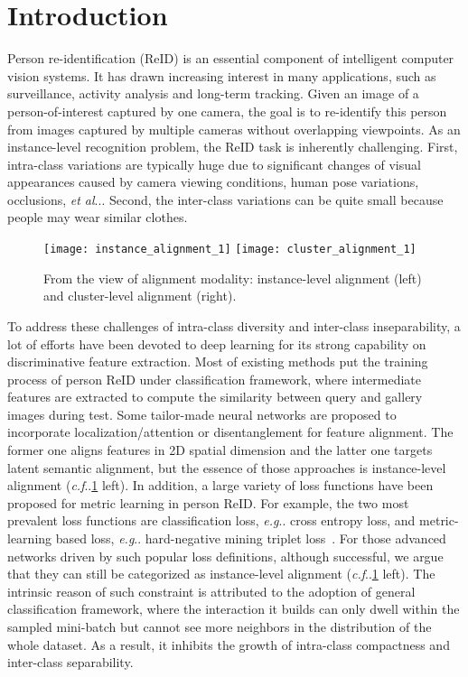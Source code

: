 \documentclass[runningheads]{llncs}
\makeatletter
\DeclareRobustCommand\onedot{\futurelet\@let@token\@onedot}
\def\@onedot{\ifx\@let@token.\else.\null\fi\xspace}
\def\eg{\emph{e.g}\onedot} \def\Eg{\emph{E.g}\onedot}
\def\cf{\emph{c.f}\onedot} \def\Cf{\emph{C.f}\onedot}
\def\etal{\emph{et al}\onedot}
\makeatother
\begin{document}
\section{Introduction}
Person re-identification (ReID) is an essential component of intelligent computer vision systems. It has drawn increasing interest in many applications, such as surveillance, activity analysis and long-term tracking.  Given an image of a person-of-interest captured by one  camera, the goal is to re-identify this person from images captured by multiple cameras without overlapping viewpoints. As an instance-level recognition problem, the ReID task is inherently challenging. First, intra-class variations are typically huge due to significant changes of visual appearances caused by camera viewing conditions, human pose variations, occlusions, \etal. Second, the inter-class variations can be quite small because people may wear similar clothes.

\begin{figure}
    \centering
    \texttt{[image: instance\_alignment\_1]}
    \texttt{[image: cluster\_alignment\_1]}
    \vspace*{-0.38cm}
    \caption{From the view of alignment modality: instance-level alignment (left) and cluster-level alignment (right).}
    \label{fig:comp-alignment}
    \vspace*{-0.68cm}
\end{figure}
To address these challenges of  intra-class diversity and inter-class inseparability, a lot of efforts have been devoted to deep learning for its strong capability on discriminative feature extraction. Most of existing methods put the training process of person ReID under classification framework, where intermediate features are extracted to compute the similarity between query and gallery images during test. Some tailor-made neural networks are proposed to incorporate localization/attention or disentanglement for feature alignment. The former one aligns features in 2D spatial dimension and the latter one targets latent semantic alignment, but the essence of those approaches is instance-level alignment (\cf \cref{fig:comp-alignment} left).
In addition, a large variety of loss functions have been proposed for metric learning in person ReID. For example, the two most prevalent loss functions are classification loss, \eg cross entropy loss, and metric-learning based loss, \eg hard-negative mining triplet loss~\cite{hermans-triplethard}. For those advanced networks driven by such popular loss definitions, although successful, we argue that they can still be categorized as instance-level alignment (\cf \cref{fig:comp-alignment} left).
The intrinsic reason of such constraint is attributed to the adoption of general classification framework, where the interaction it builds can only dwell within the sampled mini-batch but cannot see more neighbors in the distribution of the whole dataset. As a result, it inhibits the growth of intra-class compactness and inter-class separability.
\end{document}
